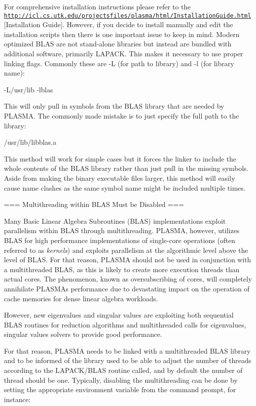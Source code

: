 For comprehensive installation instructions please refer to the \href{http://icl.cs.utk.edu/projectsfiles/plasma/html/InstallationGuide.html}{\tt http\+://icl.\+cs.\+utk.\+edu/projectsfiles/plasma/html/\+Installation\+Guide.\+html}\mbox{[}Installation Guide\mbox{]}. However, if you decide to install manually and edit the installation scripts then there is one important issue to keep in mind. Modern optimized B\+L\+A\+S are not stand-\/alone libraries but instead are bundled with additional software, primarily L\+A\+P\+A\+C\+K. This makes it necessary to use proper linking flags. Commonly these are -\/\+L (for path to library) and -\/l (for library name)\+:

-\/\+L/usr/lib -\/lblas

This will only pull in symbols from the B\+L\+A\+S library that are needed by P\+L\+A\+S\+M\+A. The commonly made mistake is to just specify the full path to the library\+:

/usr/lib/libblas.a

This method will work for simple cases but it forces the linker to include the whole contents of the B\+L\+A\+S library rather than just pull in the missing symbols. Aside from making the binary executable files larger, this method will easily cause name clashes as the same symbol name might be included multiple times.

=== Multithreading within B\+L\+A\+S Must be Disabled ===

Many Basic Linear Algebra Subroutines (B\+L\+A\+S) implementations exploit parallelism within B\+L\+A\+S through multithreading. P\+L\+A\+S\+M\+A, however, utilizes B\+L\+A\+S for high performance implementations of single-\/core operations (often referred to as {\itshape kernels}) and exploits parallelism at the algorithmic level above the level of B\+L\+A\+S. For that reason, P\+L\+A\+S\+M\+A should not be used in conjunction with a multithreaded B\+L\+A\+S, as this is likely to create more execution threads than actual cores. The phenomenon, known as oversubscribing of cores, will completely annihilate P\+L\+A\+S\+M\+A\textquotesingle{}s performance due to devastating impact on the operation of cache memories for dense linear algebra workloads.

However, new eigenvalues and singular values are exploiting both sequential B\+L\+A\+S routines for reduction algorithms and multithreaded calls for eigenvalues, singular values solvers to provide good performance.

For that reason, P\+L\+A\+S\+M\+A needs to be linked with a multithreaded B\+L\+A\+S library and to be informed of the library used to be able to adjust the number of threads according to the L\+A\+P\+A\+C\+K/\+B\+L\+A\+S routine called, and by default the number of thread should be one. Typically, disabling the multithreading can be done by setting the appropriate environment variable from the command prompt, for instance\+:

